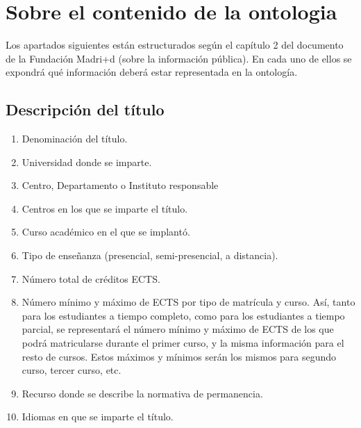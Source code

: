 \chapter{Sobre el contenido de la ontologia}

Los apartados siguientes están estructurados según el capítulo 2 del documento de la Fundación Madri+d\cite{guiaMadridMasD} (sobre la información pública). En cada uno de ellos se expondrá qué información deberá estar representada en la ontología.


\section{Descripción del título}

\begin{enumerate}

    \item Denominación del título.

    \item Universidad donde se imparte.

    \item Centro, Departamento o Instituto responsable

    \item Centros en los que se imparte el título.

    \item Curso académico en el que se implantó.

    \item Tipo de enseñanza (presencial, semi-presencial, a distancia).

    \item Número total de créditos ECTS.

    \item Número mínimo y máximo de ECTS por tipo de matrícula y curso. Así, tanto para
        los estudiantes a tiempo completo, como para los estudiantes a tiempo
        parcial, se representará el número mínimo y máximo de ECTS de los que
        podrá matricularse durante el primer curso, y la misma información para
        el resto de cursos. Estos máximos y mínimos serán los mismos para
        segundo curso, tercer curso, etc.

    \item Recurso donde se describe la normativa de permanencia.

    \item Idiomas en que se imparte el título.

\end{enumerate}

